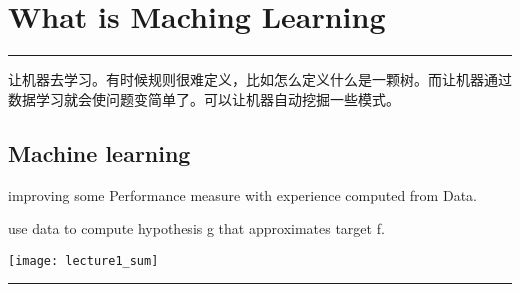 \section{What is Maching Learning}
\noindent
{\color{LightRubineRed} \rule{\linewidth}{1mm} }
让机器去学习。有时候规则很难定义，比如怎么定义什么是一颗树。而让机器通过数据学习就会使问题变简单了。可以让机器自动挖掘一些模式。\par
\subsection{Machine learning}
improving some Performance measure with experience computed from Data. \par
use \textcolor{Mycolor1}{data} to compute hypothesis g that \textcolor{Mycolor1}{approximates} target f. \par

\begin{center}
\texttt{[image: lecture1\_sum]}\\
\end{center}

\noindent
{\color{RubineRed} \rule{\linewidth}{1mm} }
